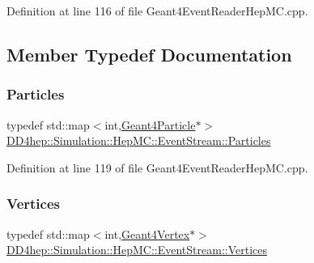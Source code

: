 Definition at line 116 of file Geant4\+Event\+Reader\+Hep\+M\+C.\+cpp.



\subsection{Member Typedef Documentation}
\hypertarget{class_d_d4hep_1_1_simulation_1_1_hep_m_c_1_1_event_stream_a99e0260f816229d8ab3ebdd5487b3af1}{}\label{class_d_d4hep_1_1_simulation_1_1_hep_m_c_1_1_event_stream_a99e0260f816229d8ab3ebdd5487b3af1} 
\subsubsection{\texorpdfstring{Particles}{Particles}}
{\footnotesize\ttfamily typedef std\+::map$<$int,\hyperlink{class_d_d4hep_1_1_simulation_1_1_geant4_particle}{Geant4\+Particle}$\ast$$>$ \hyperlink{class_d_d4hep_1_1_simulation_1_1_hep_m_c_1_1_event_stream_a99e0260f816229d8ab3ebdd5487b3af1}{D\+D4hep\+::\+Simulation\+::\+Hep\+M\+C\+::\+Event\+Stream\+::\+Particles}}



Definition at line 119 of file Geant4\+Event\+Reader\+Hep\+M\+C.\+cpp.

\hypertarget{class_d_d4hep_1_1_simulation_1_1_hep_m_c_1_1_event_stream_a3e270d38edde8369e52ad396615a2755}{}\label{class_d_d4hep_1_1_simulation_1_1_hep_m_c_1_1_event_stream_a3e270d38edde8369e52ad396615a2755} 
\subsubsection{\texorpdfstring{Vertices}{Vertices}}
{\footnotesize\ttfamily typedef std\+::map$<$int,\hyperlink{class_d_d4hep_1_1_simulation_1_1_geant4_vertex}{Geant4\+Vertex}$\ast$$>$ \hyperlink{class_d_d4hep_1_1_simulation_1_1_hep_m_c_1_1_event_stream_a3e270d38edde8369e52ad396615a2755}{D\+D4hep\+::\+Simulation\+::\+Hep\+M\+C\+::\+Event\+Stream\+::\+Vertices}}




